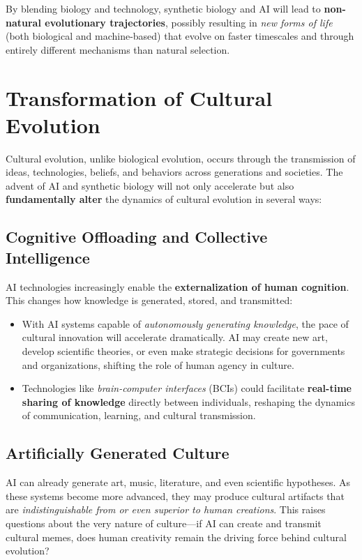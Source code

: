 \documentclass[12pt,titlepage]{book}
\begin{document}
By blending biology and technology, synthetic biology and AI will lead to \textbf{non-natural evolutionary trajectories}, possibly resulting in \textit{new forms of life} (both biological and machine-based) that evolve on faster timescales and through entirely different mechanisms than natural selection.

\section{Transformation of Cultural Evolution}

Cultural evolution, unlike biological evolution, occurs through the transmission of ideas, technologies, beliefs, and behaviors across generations and societies. The advent of AI and synthetic biology will not only accelerate but also \textbf{fundamentally alter} the dynamics of cultural evolution in several ways:

\subsection{Cognitive Offloading and Collective Intelligence}

AI technologies increasingly enable the \textbf{externalization of human cognition}. This changes how knowledge is generated, stored, and transmitted:
\begin{itemize}
    \item With AI systems capable of \textit{autonomously generating knowledge}, the pace of cultural innovation will accelerate dramatically. AI may create new art, develop scientific theories, or even make strategic decisions for governments and organizations, shifting the role of human agency in culture.
    \item Technologies like \textit{brain-computer interfaces} (BCIs) could facilitate \textbf{real-time sharing of knowledge} directly between individuals, reshaping the dynamics of communication, learning, and cultural transmission.
\end{itemize}

\subsection{Artificially Generated Culture}

AI can already generate art, music, literature, and even scientific hypotheses. As these systems become more advanced, they may produce cultural artifacts that are \textit{indistinguishable from or even superior to human creations}. This raises questions about the very nature of culture—if AI can create and transmit cultural memes, does human creativity remain the driving force behind cultural evolution? 
\end{document}
